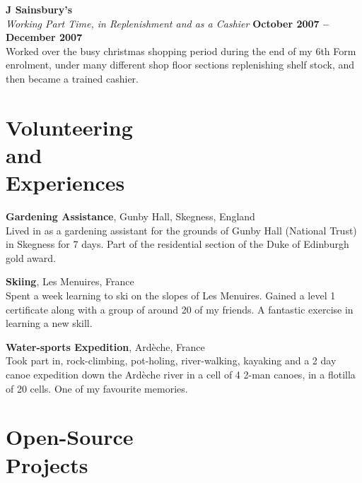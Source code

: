 \documentclass[margin,line]{resume}
\begin{document}
\begin{resume}
	\newpage
	\textbf{J Sainsbury's} \vspace{2mm}\\\vspace{1mm}%
	\textsl{Working Part Time, in Replenishment and as a Cashier}  \hfill \textbf{October 2007 -- December 2007}\\
	Worked over the busy christmas shopping period during the end of my 6th Form enrolment, under many different shop floor sections replenishing shelf stock, and then became a trained cashier.
	
    \section{\mysidestyle Volunteering\\and\\Experiences}
    
    \textbf{Gardening Assistance}, Gunby Hall, Skegness, England \vspace{2mm}\\\vspace{1mm}%
    Lived in as a gardening assistant for the grounds of Gunby Hall (National Trust) in Skegness for 7 days.
    Part of the residential section of the Duke of Edinburgh gold award.
    
    \textbf{Skiing}, Les Menuires, France \vspace{2mm}\\\vspace{1mm}%
    Spent a week learning to ski on the slopes of Les Menuires. Gained a level 1 certificate along with a group of around 20 of my friends.
    A fantastic exercise in learning a new skill.
    
    \textbf{Water-sports Expedition}, Ard\`eche, France \vspace{2mm}\\\vspace{1mm}%
    Took part in, rock-climbing, pot-holing, river-walking, kayaking and a 2 day canoe expedition down the Ard\`eche
    river in a cell of 4 2-man canoes, in a flotilla of 20 cells. One of my favourite memories.
	
    \section{\mysidestyle Open-Source\\Projects}


\end{resume}
\end{document}
